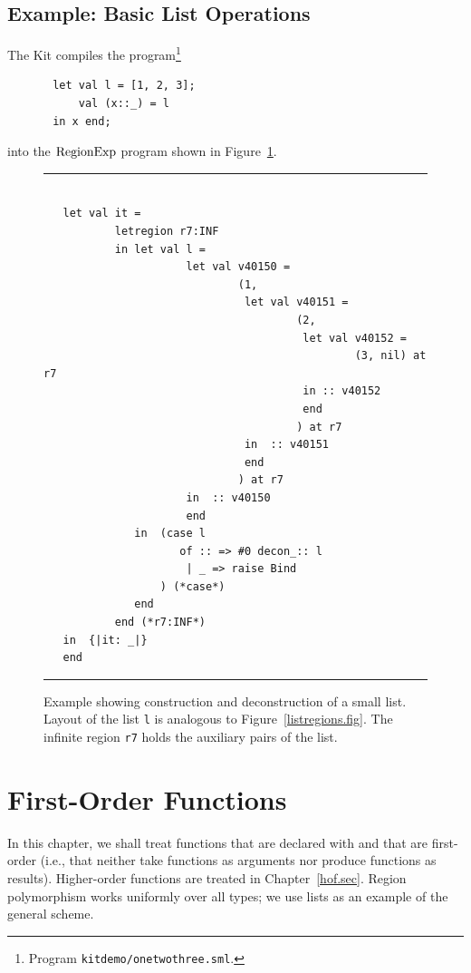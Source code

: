 \documentclass[12pt]{book}
\begin{document}
\section{Example: Basic List Operations}
\label{listexamples.sec}
The Kit compiles the program\footnote{Program \texttt{kitdemo/onetwothree.sml}.}  
\begin{verbatim}
       let val l = [1, 2, 3];
           val (x::_) = l
       in x end;
\end{verbatim}       
into the $\hbox{\rm RegionExp}$ program shown in Figure~\ref{listprint.fig}.
\begin{figure}
\hrule
\begin{verbatim}

   let val it = 
           letregion r7:INF 
           in let val l = 
                      let val v40150 = 
                              (1, 
                               let val v40151 = 
                                       (2, 
                                        let val v40152 = 
                                                (3, nil) at r7 
                                        in :: v40152 
                                        end 
                                       ) at r7
                               in  :: v40151
                               end 
                              ) at r7
                      in  :: v40150
                      end 
              in  (case l 
                     of :: => #0 decon_:: l 
                      | _ => raise Bind
                  ) (*case*) 
              end  
           end (*r7:INF*)
   in  {|it: _|}
   end 
\end{verbatim}
\caption{Example showing construction and deconstruction of a small list.
Layout of the list {\tt l} is analogous to Figure~\ref{listregions.fig}.
The infinite region {\tt r7} holds the auxiliary pairs of the list.
}
\label{listprint.fig}
\medskip

\hrule
\end{figure}

\chapter{First-Order Functions}
In this chapter, we shall treat functions that are declared with
 and that are first-order (i.e., that neither take functions
as arguments nor produce functions as results). Higher-order functions
are treated in Chapter~\ref{hof.sec}.
Region polymorphism works uniformly over all types; 
we use lists as an example of the general scheme. 
\end{document}
